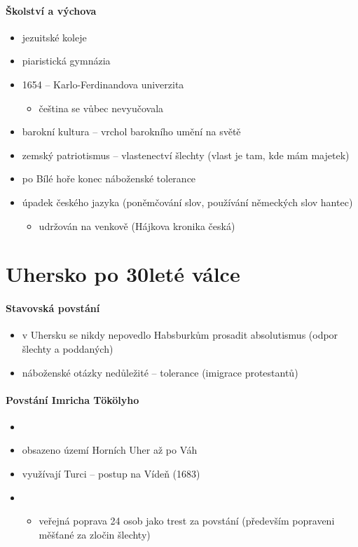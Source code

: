 \paragraph{Školství a výchova}
\begin{itemize}
\item jezuitské koleje
\item piaristická gymnázia
\item 1654 -- Karlo-Ferdinandova univerzita
	\begin{itemize}
	\item čeština se vůbec nevyučovala
	\end{itemize}
\item barokní kultura -- vrchol barokního umění na světě
\item zemský patriotismus -- vlastenectví šlechty (vlast je tam, kde mám majetek)
\item po Bílé hoře konec náboženské tolerance
\item úpadek českého jazyka (poněmčování slov, používání německých slov \ra hantec)
	\begin{itemize}
	\item udržován na venkově (Hájkova kronika česká)
	\end{itemize}
\end{itemize}


\section{Uhersko po 30leté válce}
\paragraph{Stavovská povstání}
\begin{itemize}
\item v Uhersku se nikdy nepovedlo Habsburkům prosadit absolutismus (odpor šlechty a poddaných)
\item náboženské otázky nedůležité -- tolerance (\ra imigrace protestantů)
\end{itemize}

\paragraph{Povstání Imricha Tökölyho}
\begin{itemize}
\item {}
\item obsazeno území Horních Uher až po Váh
\item využívají Turci -- postup na Vídeň (1683)
\item {}
	\begin{itemize}
	\item veřejná poprava 24 osob jako trest za povstání (především popraveni měšťané za zločin šlechty)
	\end{itemize}
\end{itemize}

